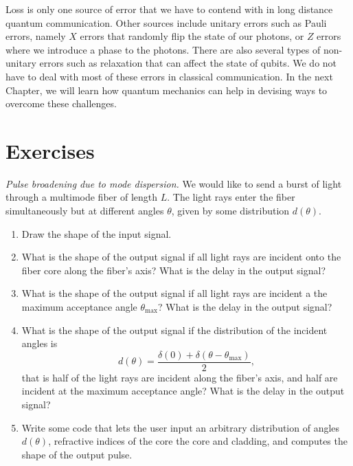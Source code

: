 Loss is only one source of error that we have to contend with in long distance quantum communication.
Other sources include unitary errors such as Pauli errors, namely $X$ errors that randomly flip the state of our photons, or $Z$ errors where we introduce a phase to the photons.
There are also several types of non-unitary errors such as relaxation that can affect the state of qubits.
We do not have to deal with most of these errors in classical communication.
In the next Chapter, we will learn how quantum mechanics can help in devising ways to overcome these challenges.


\newpage
\section{Exercises}

\begin{exercise}
\emph{Pulse broadening due to mode dispersion.} We would like to send a burst of light through a multimode fiber of length $L$.
The light rays enter the fiber simultaneously but at different angles $\theta$, given by some distribution $d(\theta)$.
\begin{enumerate}[label=(\alph*)]
    \item Draw the shape of the input signal.
    \item What is the shape of the output signal if all light rays are incident onto the fiber core along the fiber's axis? What is the delay in the output signal?
    \item What is the shape of the output signal if all light rays are incident a the maximum acceptance angle $\theta_{\text{max}}$? What is the delay in the output signal?
    \item What is the shape of the output signal if the distribution of the incident angles is
    \begin{equation}
        d(\theta) = \frac{\delta(0)+\delta(\theta-\theta_{\text{max}})}{2},
    \end{equation}
    that is half of the light rays are incident along the fiber's axis, and half are incident at the maximum acceptance angle? What is the delay in the output signal?
    \item Write some code that lets the user input an arbitrary distribution of angles $d(\theta)$, refractive indices of the core the core and cladding, and computes the shape of the output pulse.
\end{enumerate}  
\end{exercise}
